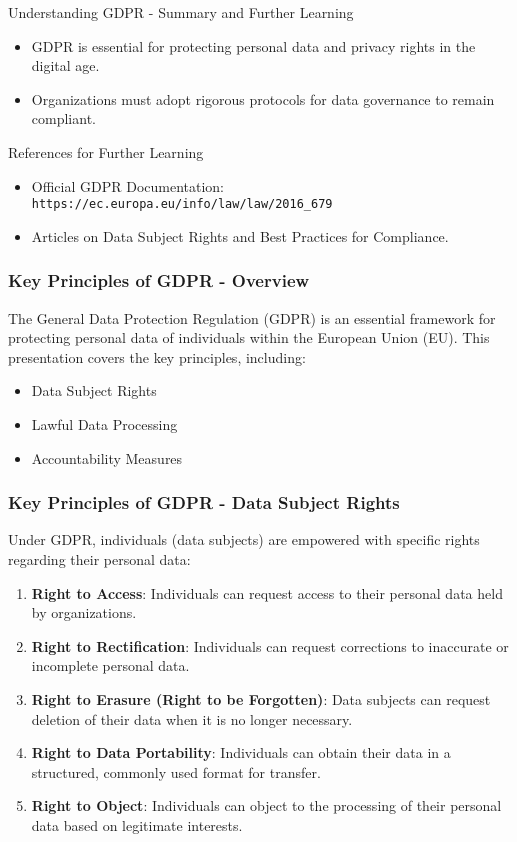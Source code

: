 \documentclass[aspectratio=169]{beamer}
\begin{document}
\begin{frame}[fragile]{Understanding GDPR - Summary and Further Learning}
    \begin{itemize}
        \item GDPR is essential for protecting personal data and privacy rights in the digital age.
        \item Organizations must adopt rigorous protocols for data governance to remain compliant.
    \end{itemize}
    \begin{block}{References for Further Learning}
        \begin{itemize}
            \item Official GDPR Documentation: \texttt{https://ec.europa.eu/info/law/law/2016_679}
            \item Articles on Data Subject Rights and Best Practices for Compliance.
        \end{itemize}
    \end{block}
\end{frame}

\begin{frame}[fragile]
    \frametitle{Key Principles of GDPR - Overview}
    The General Data Protection Regulation (GDPR) is an essential framework for protecting personal data of individuals within the European Union (EU). 
    This presentation covers the key principles, including:
    \begin{itemize}
        \item Data Subject Rights
        \item Lawful Data Processing
        \item Accountability Measures
    \end{itemize}
\end{frame}

\begin{frame}[fragile]
    \frametitle{Key Principles of GDPR - Data Subject Rights}
    Under GDPR, individuals (data subjects) are empowered with specific rights regarding their personal data:
    \begin{enumerate}
        \item \textbf{Right to Access}: Individuals can request access to their personal data held by organizations.
        \item \textbf{Right to Rectification}: Individuals can request corrections to inaccurate or incomplete personal data.
        \item \textbf{Right to Erasure (Right to be Forgotten)}: Data subjects can request deletion of their data when it is no longer necessary.
        \item \textbf{Right to Data Portability}: Individuals can obtain their data in a structured, commonly used format for transfer.
        \item \textbf{Right to Object}: Individuals can object to the processing of their personal data based on legitimate interests.
    \end{enumerate}
\end{frame}
\end{document}
